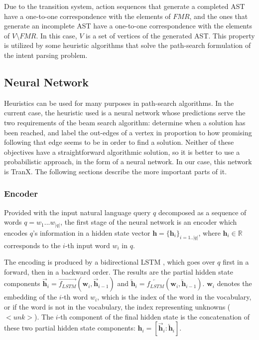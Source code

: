 Due to the transition system, action sequences that generate a completed
AST have a one-to-one correspondence with the elements of \(FMR\),
and the ones that generate an incomplete AST have a one-to-one correspondence
with the elements of \(V \setminus FMR\). In this case, \( V \) is a set
of vertices of the generated AST. This property is utilized by some
heuristic algorithms that solve the path-search formulation of
the intent parsing problem.

\subsection{Neural Network}

Heuristics can be used for many purposes in path-search algorithms. In the current
case, the heuristic used is a neural network whose predictions serve the two
requirements of the beam search algorithm: determine when a solution has been
reached, and label the out-edges of a vertex in proportion to how promising
following that edge seems to be in order to find a solution. Neither of these
objectives have a straightforward algorithmic solution, so it is better
to use a probabilistic approach, in the form of a neural network. In our case, 
this network is TranX. The following sections describe the more important
parts of it.

\subsubsection{Encoder}

Provided with the input natural language query \(q\) decomposed as a sequence
of words \(q = w_{1}...w_{|q|}\), the first stage of the neural network is an
encoder which encodes \(q\)'s information in a hidden state vector \(\mathbf{h} =
\{\mathbf{h}_{i}\}_{i=1..|q|}\), where \(\mathbf{h}_{i} \in \mathbb{R}\)
corresponds to the \(i\)-th input word \(w_{i}\) in \(q\).

The encoding is produced by a bidirectional LSTM \cite{HochreiterSchmidhuber1997,
SchusterPaliwal1997}, which goes over \(q\) first in a forward, then in a backward
order. The results are the partial hidden state components
\(\overrightarrow{\mathbf{h}}_{i} = \overrightarrow{f_{LSTM}}(\mathbf{w}_{i}, \overrightarrow{\mathbf{h}}_{i-1})\) and \(\overleftarrow{\mathbf{h}}_{i} =
\overleftarrow{f_{LSTM}}(\mathbf{w}_{i}, \overleftarrow{\mathbf{h}}_{i-1})\).
\(\mathbf{w}_{i}\) denotes the embedding of the \(i\)-th word \(w_{i}\), 
which is the index of the word in the vocabulary, or if the word is not
in the vocabulary, the index representing unknowns (\(<unk>\)).
The \(i\)-th component of the final hidden state is the concatenation of
these two partial hidden state components: \(\mathbf{h}_{i} = 
[\overrightarrow{\mathbf{h}}_{i} : \overleftarrow{\mathbf{h}}_{i}]\).

